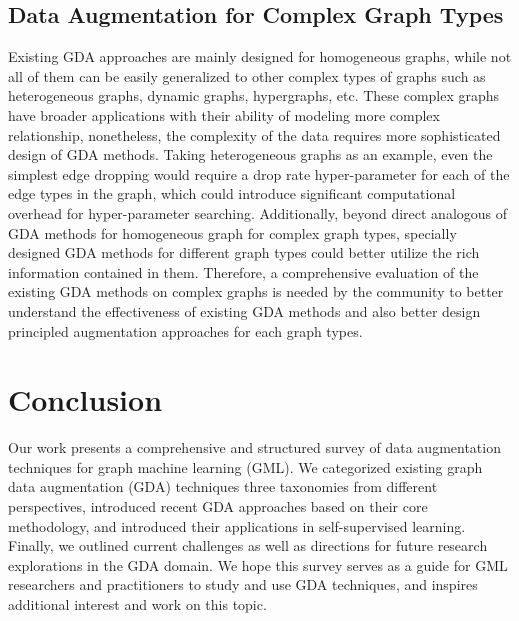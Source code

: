 \documentclass[11pt]{article}
\begin{document}
\subsection{Data Augmentation for Complex Graph Types}
Existing GDA approaches are mainly designed for homogeneous graphs, while not all of them can be easily generalized to other complex types of graphs such as heterogeneous graphs, dynamic graphs, hypergraphs, etc. These complex graphs have broader applications with their ability of modeling more complex relationship, nonetheless, the complexity of the data requires more sophisticated design of GDA methods. Taking heterogeneous graphs as an example, even the simplest edge dropping would require a drop rate hyper-parameter for each of the edge types in the graph, which could introduce significant computational overhead for hyper-parameter searching. Additionally, beyond direct analogous of GDA methods for homogeneous graph for complex graph types, specially designed GDA methods for different graph types could better utilize the rich information contained in them. Therefore, a comprehensive evaluation of the existing GDA methods on complex graphs is needed by the community to better understand the effectiveness of existing GDA methods and also better design principled augmentation approaches for each graph types.

\section{Conclusion}
\label{sec:conclusion}
Our work presents a comprehensive and structured survey of data augmentation techniques for graph machine learning (GML). We categorized existing graph data augmentation (GDA) techniques three taxonomies from different perspectives, introduced recent GDA approaches based on their core methodology, and introduced their applications in self-supervised learning. Finally, we outlined current challenges as well as directions for future research explorations in the GDA domain. We hope this survey serves as a guide for GML researchers and practitioners to study and use GDA techniques, and inspires additional interest and work on this topic.

% 
% 
\end{document}
